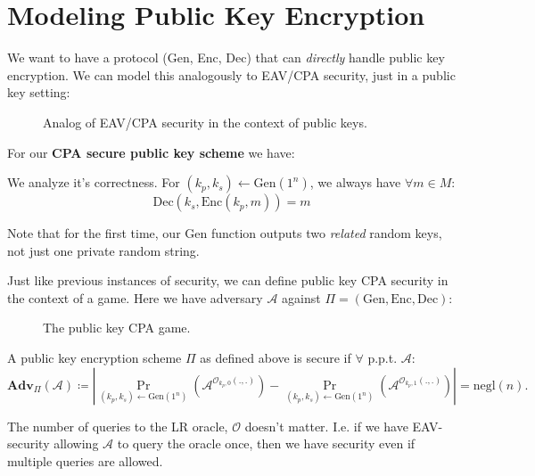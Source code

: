 \section{Modeling Public Key Encryption}
We want to have a protocol (Gen, Enc, Dec) that can \emph{directly} handle public key encryption. We can model this analogously to EAV/CPA security, just in a public key setting:

\begin{figure}[H]
	\centering
	\caption{Analog of EAV/CPA security in the context of public keys.}
	\label{fig:pubeavcpa}
\end{figure}

\begin{definition}
	For our \textbf{CPA secure public key scheme} we have:
	We analyze it's correctness. For \((k_p, k_s) \gets \mathrm{Gen}(1^n)\), we always have \(\forall m \in M\):
	\[
		\mathrm{Dec}(k_s, \mathrm{Enc}(k_p, m)) = m
	\] 
\end{definition}
\begin{remark}
	Note that for the first time, our Gen function outputs two \emph{related} random keys, not just one private random string.
\end{remark}

Just like previous instances of security, we can define public key CPA security in the context of a game. Here we have adversary \(\mathcal{A} \) against \(\Pi = (\mathrm{Gen, Enc, Dec})\):

\begin{figure}[H]
	\centering
	\caption{The public key CPA game.}
	\label{fig:pubcpasec}
\end{figure}

\begin{definition}
	A public key encryption scheme \(\Pi\) as defined above is secure if \(\forall\) p.p.t. \(\mathcal{A} \):
	\[
		\mathbf{Adv}_\Pi (\mathcal{A}) \coloneqq \left| 
			\Pr_{(k_p, k_s) \gets \mathrm{Gen}(1^n)} (\mathcal{A}^{\mathcal{O}_{k_p, 0} (.,.)}) -
		  \Pr_{(k_p, k_s) \gets \mathrm{Gen}(1^n)} (\mathcal{A}^{\mathcal{O}_{k_p, 1} (.,.)})
		\right| =
		\mathrm{negl}(n).
	\]
\end{definition}
\begin{remark}
	The number of queries to the LR oracle, \(\mathcal{O} \) doesn't matter. I.e. if we have EAV-security allowing \(\mathcal{A} \) to query the oracle once, then we have security even if multiple queries are allowed.
\end{remark}

